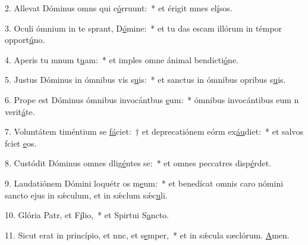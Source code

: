 2. Allevat Dóminus omns qui c\uline{ó}rruunt:~* et érigit mnes el\uline{í}sos.\par 
3. Oculi ómnium in te sprant, D\uline{ó}mine:~* et tu das escam illórum in témpor opport\uline{ú}no.\par 
4. Aperis tu mnum t\uline{u}am:~* et imples omne ánimal bendicti\uline{ó}ne.\par 
5. Justus Dóminus in ómnibus vis s\uline{u}is:~* et sanctus in ómnibus opribus s\uline{u}is.\par 
6. Prope est Dóminus ómnibus invocántbus \uline{e}um:~* ómnibus invocántibus eum n verit\uline{á}te.\par 
7. Voluntátem timéntium se \uline{fá}ciet:~† et deprecatiónem eórm ex\uline{áu}diet:~* et salvos fciet \uline{e}os.\par 
8. Custódit Dóminus omnes dlig\uline{é}ntes se:~* et omnes peccatres disp\uline{é}rdet.\par 
9. Laudatiónem Dómini loquétr os m\uline{e}um:~* et benedícat omnis caro nómini sancto ejus in sǽculum, et in sǽclum sǽc\uline{u}li.\par 
10. Glória Patr, et F\uline{í}lio,~* et Spirtui S\uline{a}ncto.\par 
11. Sicut erat in princípio, et nnc, et s\uline{e}mper,~* et in sǽcula sæclórum. \uline{A}men.\par 
